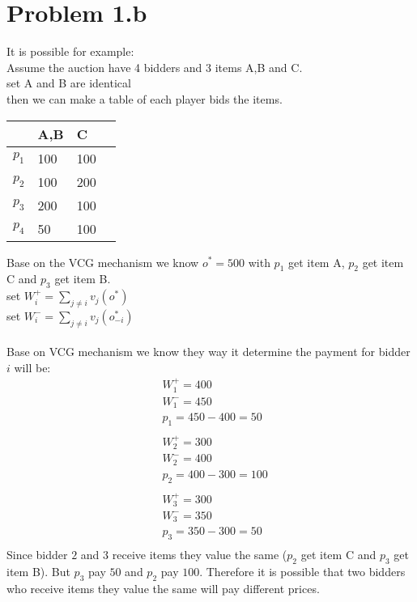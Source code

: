 \documentclass{article}
\begin{document}
\newpage
\section{Problem 1.b}
 It is possible for example: \\
 Assume the auction have 4 bidders and 3 items A,B and C.\\
 set A and B are identical\\
 then we can make a table of each player bids the items.
 \begin{center}
\begin{tabular}{ | m{4em} | m{4em}| m{4em} | m{4em} |} 
  \hline
   & A,B & C \\ 
  \hline
  $p_1$ & 100 & 100 \\ 
  \hline
  $p_2$ & 100 & 200 \\ 
  \hline
  $p_3$ & 200 & 100 \\ 
  \hline
  $p_4$ & 50 & 100 \\ 
  \hline
\end{tabular}
\end{center}
Base on the VCG mechanism we know $o^* = 500$ with $p_1$ get item A, $p_2$ get item C and $p_3$ get item B.\\
set $W^+_i = \sum_{j \not = i} v_j(o^*)$\\
set $W^-_i = \sum_{j \not = i} v_j(o_{-i}^*)$\\\\
Base on VCG mechanism we know they way it determine the payment for bidder $i$ will be:
\begin{align*}
&W^+_1 = 400\\
&W^-_1 = 450\\
&p_1 = 450 - 400 = 50\\\\
&W^+_2 = 300\\
&W^-_2 = 400\\
&p_2 = 400 - 300 = 100\\\\
&W^+_3 = 300\\
&W^-_3 = 350\\
&p_3 = 350 - 300 = 50\\
\end{align*}
Since bidder $2$ and $3$ receive items they value the same ($p_2$ get item C and $p_3$ get item B). But $p_3$ pay $50$ and $p_2$ pay $100$. Therefore it is possible that two bidders who receive items they value the same will pay different prices.
\end{document}
